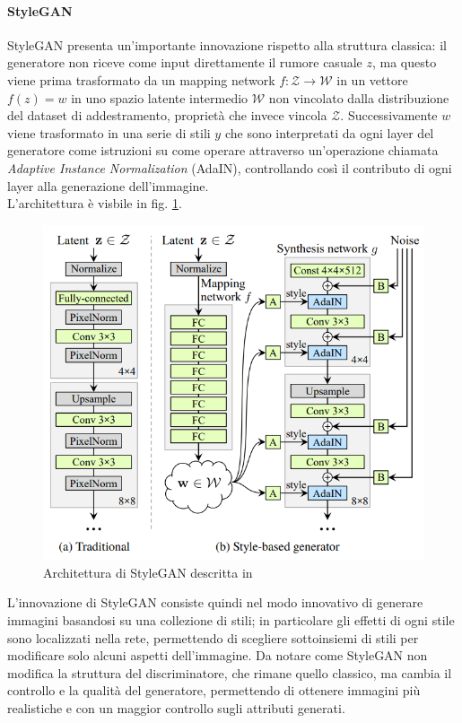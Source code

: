 \paragraph{StyleGAN}\label{par:style}
StyleGAN \cite{karras2019style} presenta un'importante innovazione rispetto alla struttura classica: il generatore non riceve come input direttamente il rumore casuale $z$, ma questo viene prima trasformato da un mapping network $f : \mathcal{Z} \rightarrow \mathcal{W}$ in un vettore $f(z) = w$ in uno spazio latente intermedio $\mathcal{W}$ non vincolato dalla distribuzione del dataset di addestramento, proprietà che invece vincola $\mathcal{Z}$. Successivamente $w$ viene trasformato in una serie di stili $y$ che sono interpretati da ogni layer del generatore come istruzioni su come operare attraverso un'operazione chiamata \textit{Adaptive Instance Normalization} (AdaIN), controllando così il contributo di ogni layer alla generazione dell'immagine.\\L'architettura è visbile in fig. \ref{fig:stylegan}.
\begin{figure}
    \centering
    \includegraphics[width=1\linewidth]{img/style-arch.png} \caption{Architettura di StyleGAN descritta in \cite{karras2019style}}\label{fig:stylegan}
\end{figure}
L'innovazione di StyleGAN consiste quindi nel modo innovativo di generare immagini basandosi su una collezione di stili; in particolare gli effetti di ogni stile sono localizzati nella rete, permettendo di scegliere sottoinsiemi di stili per modificare solo alcuni aspetti dell'immagine.
Da notare come StyleGAN non modifica la struttura del discriminatore, che rimane quello classico, ma cambia il controllo e la qualità del generatore, permettendo di ottenere immagini più realistiche e con un maggior controllo sugli attributi generati.
